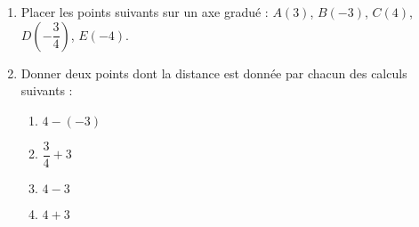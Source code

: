 
\begin{exercice}\label{exo2smath-0238}

    \setlength{\columnseprule}{0pt}       %
    \begin{enumerate}
        \item
            Placer les points suivants sur un axe gradué : \( A(3)\), \( B(-3)\), \( C(4)\), \( D(-\dfrac{ 3 }{ 4 })\), \( E(-4)\).
        \item
            Donner deux points dont la distance est donnée par chacun des calculs suivants :
            \begin{multicols}{2}
            \begin{enumerate}
                \item
                    \( 4-(-3)\)
                \item
                    \( \dfrac{ 3 }{ 4 }+3\)
                \item
                    \( 4-3\)
                \item
                    \( 4+3\)
            \end{enumerate}
            \end{multicols}
    \end{enumerate}

\end{exercice}
